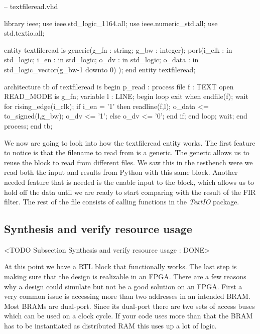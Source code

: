 \begin{VHDLlisting}[tabsize=4]
-- textfileread.vhd

library ieee;
	use ieee.std_logic_1164.all;
	use ieee.numeric_std.all;
	use std.textio.all;
	
entity textfileread is
generic(g_fn : string;
        g_bw : integer);
port(i_clk  : in    std_logic;
     i_en   : in    std_logic;
     o_dv   : in    std_logic;
     o_data : in    std_logic_vector(g_bw-1 downto 0)	
	);
end entity textfileread;

architecture tb of textfileread is
begin
    p_read : process
        file f : TEXT open READ_MODE is g_fn;
        variable l : LINE;
    begin
        loop
            exit when endfile(f);
            wait for rising_edge(i_clk);
            if i_en = '1' then
                readline(f,l);
                o_data <= to_signed(l,g_bw);
                o_dv <= '1';
            else
                o_dv <= '0';
            end if;
        end loop;
        wait;
    end process;
end tb;
\end{VHDLlisting}

We now are going to look into how the textfileread entity works. The first feature to notice is that the filename to read from is a generic. The generic allows us to reuse the block to read from different files. We saw this in the testbench were we read both the input and results from Python with this same block. Another needed feature that is needed is the enable input to the block, which allows us to hold off the data until we are ready to start comparing with the result of the \ac{FIR} filter. The rest of the file consists of calling functions in the \emph{TextIO} package.
	
\subsection{Synthesis and verify resource usage}
	<TODO Subsection Synthesis and verify resource usage : DONE>

At this point we have a \ac{RTL} block that functionally works. The last step is making sure that the design is realizable in an \ac{FPGA}. There are a few reasons why a design could simulate but not be a good solution on an \ac{FPGA}. First a very common issue is accessing more than two addresses in an intended \ac{BRAM}. Most \ac{BRAM}s are dual-port. Since its dual-port there are two sets of access buses which can be used on a clock cycle. If your code uses more than that the \ac{BRAM} has to be instantiated as distributed \ac{RAM} this uses up a lot of logic.

